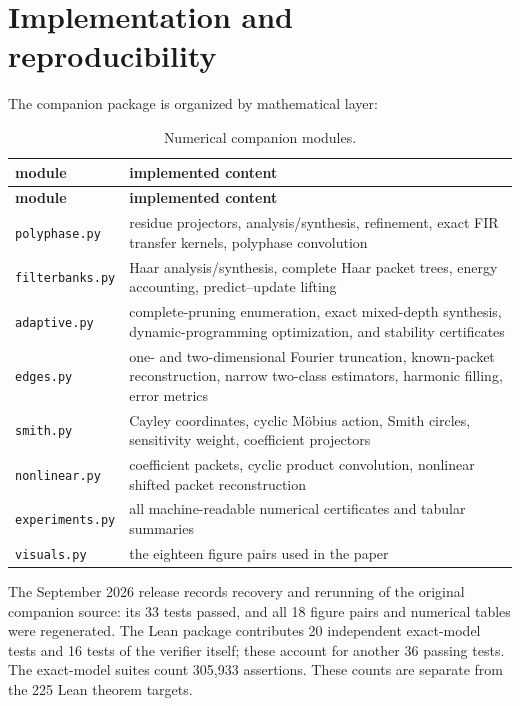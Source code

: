 \documentclass[11pt,a4paper]{article}
\theoremstyle{definition}
\theoremstyle{remark}
\begin{document}
\section{Implementation and reproducibility}\label{core:section:16}

The companion package is organized by mathematical layer:

\begin{longtable}{L{0.27\textwidth}L{0.64\textwidth}}
\caption{Numerical companion modules.}\label{tab:modules}\\
\toprule
\textbf{module}&\textbf{implemented content}\\
\midrule
\endfirsthead
\toprule
\textbf{module}&\textbf{implemented content}\\
\midrule
\endhead
\texttt{polyphase.py}&residue projectors, analysis/synthesis, refinement, exact FIR transfer kernels, polyphase convolution\\
\texttt{filterbanks.py}&Haar analysis/synthesis, complete Haar packet trees, energy accounting, predict--update lifting\\
\texttt{adaptive.py}&complete-pruning enumeration, exact mixed-depth synthesis, dynamic-programming optimization, and stability certificates\\
\texttt{edges.py}&one- and two-dimensional Fourier truncation, known-packet reconstruction, narrow two-class estimators, harmonic filling, error metrics\\
\texttt{smith.py}&Cayley coordinates, cyclic M\"obius action, Smith circles, sensitivity weight, coefficient projectors\\
\texttt{nonlinear.py}&coefficient packets, cyclic product convolution, nonlinear shifted packet reconstruction\\
\texttt{experiments.py}&all machine-readable numerical certificates and tabular summaries\\
\texttt{visuals.py}&the eighteen figure pairs used in the paper\\
\bottomrule
\end{longtable}

The September 2026 release records recovery and rerunning of the original companion source: its 33 tests passed, and all 18 figure pairs and numerical tables were regenerated. The Lean package contributes 20 independent exact-model tests and 16 tests of the verifier itself; these account for another 36 passing tests. The exact-model suites count 305,933 assertions. These counts are separate from the 225 Lean theorem targets.
\end{document}
